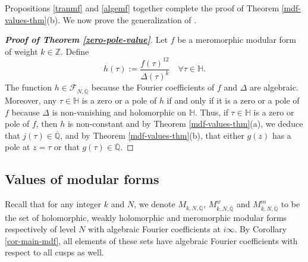 \documentclass[11pt, reqno]{amsart}
\begin{document}
Propositions \ref{tranmf} and \ref{algemf} together complete the proof of Theorem \ref{mdf-values-thm}(b). We now prove the generalization of \cite[Theorem 2.4]{jeon-kang-kim}.
\begin{proof}[\bf Proof of Theorem \ref{zero-pole-value}]
Let $f$ be a meromorphic modular form of weight $k \in \mathbb{Z}$. Define 
   $$
h(\tau):=\frac{f(\tau)^{12}}{\Delta(\tau)^k}\quad \forall \tau\in\mathbb{H}.
   $$
The function $h \in \mathcal{F}_{N,\overline{\mathbb{Q}}}$ because the Fourier coefficients of $f$ and $\Delta$ are algebraic. Moreover, any $\tau\in\mathbb{H}$ is a zero or a pole of $h$ if and only if it is a zero or a pole of $f$ because $\Delta$ is non-vanishing and holomorphic on $\mathbb{H}$. Thus, if $\tau\in\mathbb{H}$ is a zero or pole of $f$, then $h$ is non-constant and by Theorem \ref{mdf-values-thm}(a), we deduce that $j(\tau)\in\overline{\mathbb{Q}}$, and by Theorem \ref{mdf-values-thm}(b), that either $g(z)$ has a pole at $z = \tau$ or that $g(\tau)\in\overline{\mathbb{Q}}$.
\end{proof}
\bigskip

\subsection{Values of modular forms} Recall that for any integer $k$ and $N$, we denote $M_{k,N,\overline{\mathbb{Q}}}$, $M_{k,N,\overline{\mathbb{Q}}}^w$ and $M_{k,N,\overline{\mathbb{Q}}}^m$ to be the set of holomorphic, weakly holomorphic and meromorphic modular forms respectively of level $N$ with algebraic Fourier coefficients at $i\infty$. By Corollary \ref{cor-main-mdf}, all elements of these sets have algebraic Fourier coefficients with respect to all cusps as well.\\
\end{document}

